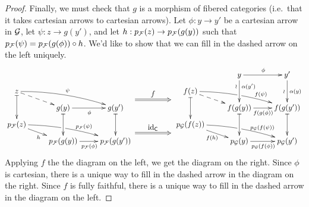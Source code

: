 \begin{proof}
   Finally, we must check that $g$ is a morphism of fibered categories (i.e.~that it takes
   cartesian arrows to cartesian arrows). Let $\phi:y\to y'$ be a cartesian arrow in $\mathcal{G}$,
   let $\psi:z\to g(y')$, and let $h:p_{\mathcal{F}}(z)\to p_{\mathcal{F}}(g(y))$ such that
   $p_{\mathcal{F}}(\psi)=p_{\mathcal{F}}(g(\phi))\circ h$. We'd like to show that we can fill in the dashed
   arrow on the left uniquely.
   \[\xymatrix@R-1.5pc{
                                                     & & & &
        & y \ar[r]^\phi \ar[dd]^(.35){\alpha(y')}_(.35)\wr & y' \ar[dd]^{\alpha(y)}_\wr \\
    z \ar@{|->}[dd]\ar@{-->}[dr] \ar@/^/[rrd]^{\psi} & & & &
        f(z) \ar@{|->}[dd]_(1.25){\qquad}="a2"_(.25){\qquad}="b2" \ar@{-->}[dr] \ar@/^/[rrd]^(.7){f(\psi)}|!{[ru];[rd]}\hole \\
    & g(y)\ar@{|->}[dd] \ar[r]_\phi & g(y') \ar@{|->}[dd]^(.75){\qquad}="a1"^(-.25){\qquad}="b1" & & &
        f(g(y)) \ar@{|->}[dd]\ar[r]_{f(g(\phi))}& f(g(y'))\ar@{|->}[dd]\\
    p_\F(z) \ar[dr]_{h} \ar@/^/[rrd]^(.65){p_\F(\psi)}|!{[ru];[rd]}\hole & & & &
        p_\G(f(z))\ar[dr]_{f(h)} \ar@/^/[rrd]^(.7){p_\G(f(\psi))}|!{[ru];[rd]}\hole\\
    & p_\F(g(y)) \ar[r]_{p_\F(\phi)} & p_\F(g(y')) & & &
        p_\G(y) \ar[r]_{p_\G(f(\phi))} & p_\G(y')
    \ar@{=>}^{\txt{$\id_\C$}} "a1";"a2"
    \ar@{=>}^{\txt{$f$}} "b1";"b2"
   }\]
   Applying $f$ the the diagram on the left, we get the diagram on the right. Since
   $\phi$ is cartesian, there is a unique way to fill in the dashed arrow in the diagram
   on the right. Since $f$ is fully faithful, there is a unique way to fill in the dashed
   arrow in the diagram on the left.
 \end{proof}
